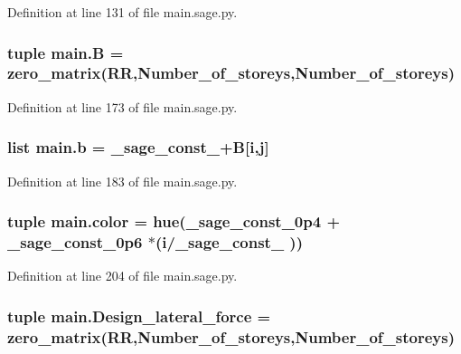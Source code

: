 Definition at line 131 of file main.\+sage.\+py.

\hypertarget{namespacemain_a6ae8768d11174f5baf9febc5244d6f06}{}
\subsubsection[{B}]{\setlength{\rightskip}{0pt plus 5cm}tuple main.\+B = zero\+\_\+matrix(R\+R,Number\+\_\+of\+\_\+storeys,Number\+\_\+of\+\_\+storeys)}\label{namespacemain_a6ae8768d11174f5baf9febc5244d6f06}


Definition at line 173 of file main.\+sage.\+py.

\hypertarget{namespacemain_ab1e783015bffd2e1d395a9099143d967}{}
\subsubsection[{b}]{\setlength{\rightskip}{0pt plus 5cm}list main.\+b = \+\_\+sage\+\_\+const\+\_+{\bf B}\mbox{[}{\bf i},{\bf j}\mbox{]}}\label{namespacemain_ab1e783015bffd2e1d395a9099143d967}


Definition at line 183 of file main.\+sage.\+py.

\hypertarget{namespacemain_aeabbf69db1809807f065c2d1e9a62567}{}
\subsubsection[{color}]{\setlength{\rightskip}{0pt plus 5cm}tuple main.\+color = hue(\+\_\+sage\+\_\+const\+\_\+0p4 + \+\_\+sage\+\_\+const\+\_\+0p6 $\ast$({\bf i}/\+\_\+sage\+\_\+const\+\_ ))}\label{namespacemain_aeabbf69db1809807f065c2d1e9a62567}


Definition at line 204 of file main.\+sage.\+py.

\hypertarget{namespacemain_a35df7d294c439792977f174dd5b04ec1}{}
\subsubsection[{Design\+\_\+lateral\+\_\+force}]{\setlength{\rightskip}{0pt plus 5cm}tuple main.\+Design\+\_\+lateral\+\_\+force = zero\+\_\+matrix(R\+R,Number\+\_\+of\+\_\+storeys,Number\+\_\+of\+\_\+storeys)}\label{namespacemain_a35df7d294c439792977f174dd5b04ec1}


